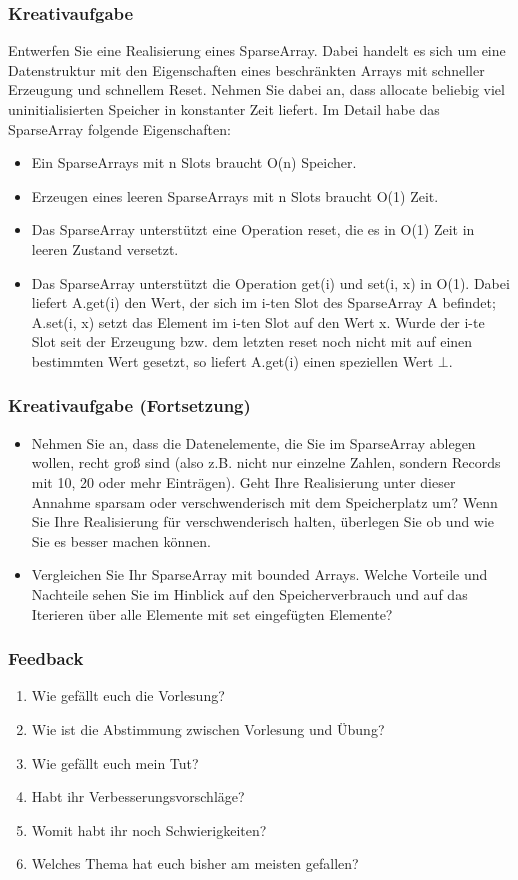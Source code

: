 \begin{frame}
\frametitle{Kreativaufgabe}
Entwerfen Sie eine Realisierung eines SparseArray. Dabei handelt es sich um eine Datenstruktur mit den Eigenschaften eines beschränkten Arrays mit schneller Erzeugung und schnellem Reset. Nehmen Sie dabei an, dass allocate beliebig viel uninitialisierten Speicher in konstanter Zeit liefert. Im Detail habe das SparseArray folgende Eigenschaften:
\begin{itemize}
\item Ein SparseArrays mit n Slots braucht O(n) Speicher.
\item Erzeugen eines leeren SparseArrays mit n Slots braucht O(1) Zeit.
\item Das SparseArray unterstützt eine Operation reset, die es in O(1) Zeit in leeren Zustand
versetzt.
\item Das SparseArray unterstützt die Operation get(i) und set(i, x) in O(1). Dabei liefert A.get(i)
den Wert, der sich im i-ten Slot des SparseArray A befindet; A.set(i, x) setzt das
Element im i-ten Slot auf den Wert x. Wurde der i-te Slot seit der Erzeugung bzw.
dem letzten reset noch nicht mit auf einen bestimmten Wert gesetzt, so liefert A.get(i)
einen speziellen Wert $\bot$.
\end{itemize}
\end{frame}

\begin{frame}
\frametitle{Kreativaufgabe (Fortsetzung)}
\begin{itemize}
\item Nehmen Sie an, dass die Datenelemente, die Sie im SparseArray ablegen wollen, recht groß
sind (also z.B. nicht nur einzelne Zahlen, sondern Records mit 10, 20 oder mehr Einträgen).
Geht Ihre Realisierung unter dieser Annahme sparsam oder verschwenderisch mit dem
Speicherplatz um? Wenn Sie Ihre Realisierung für verschwenderisch halten, überlegen Sie
ob und wie Sie es besser machen können.
\item Vergleichen Sie Ihr SparseArray mit bounded Arrays. Welche Vorteile und Nachteile sehen
Sie im Hinblick auf den Speicherverbrauch und auf das Iterieren über alle Elemente mit
set eingefügten Elemente?
\end{itemize}
\end{frame}

\begin{frame}
\frametitle{Feedback}
\begin{enumerate}
\item Wie gefällt euch die Vorlesung?
\item Wie ist die Abstimmung zwischen Vorlesung und Übung?
\item Wie gefällt euch mein Tut?
\item Habt ihr Verbesserungsvorschläge?
\item Womit habt ihr noch Schwierigkeiten?
\item Welches Thema hat euch bisher am meisten gefallen?
\end{enumerate}
\end{frame}
